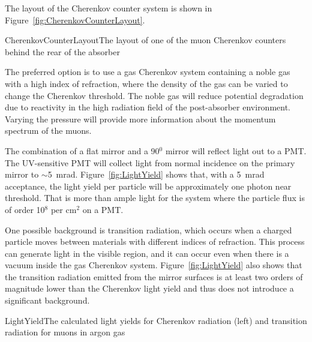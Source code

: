 The layout of the Cherenkov counter system is shown in
Figure~\ref{fig:CherenkovCounterLayout}.

\begin{cdrfigure}{CherenkovCounterLayout}{The layout of one of the muon 
Cherenkov counters behind the rear of the absorber}
\end{cdrfigure}

The preferred option is to use a gas Cherenkov system containing a
noble gas with a high index of refraction, where the density of the
gas can be varied to change the Cherenkov threshold. The noble gas
will reduce potential degradation due to reactivity in the high
radiation field of the post-absorber environment. Varying the pressure
will provide more information about the momentum spectrum of the
muons.

The combination of a flat mirror and a 90$^0$ mirror will reflect
light out to a PMT. The UV-sensitive PMT will collect light from
normal incidence on the primary mirror to $\sim$5~mrad. Figure~\ref{fig:LightYield} 
shows that, with a 5~mrad acceptance, the light
yield per particle will be approximately one photon near
threshold. That is more than ample light for the system where the
particle flux is of order 10$^8$ per cm$^2$ on a PMT. 

One possible background is transition radiation, which occurs when a charged particle moves between materials with different indices of refraction.  This process can generate light in the visible region, and it can occur even when there is a vacuum inside the gas Cherenkov system.
Figure~\ref{fig:LightYield} also shows that the transition radiation
emitted from the mirror surfaces is at least two orders of
magnitude lower than the Cherenkov light yield and thus does not introduce a
significant background.

\begin{cdrfigure}{LightYield}{The calculated light yields for Cherenkov radiation (left) and transition radiation for muons in argon gas}
\end{cdrfigure}

